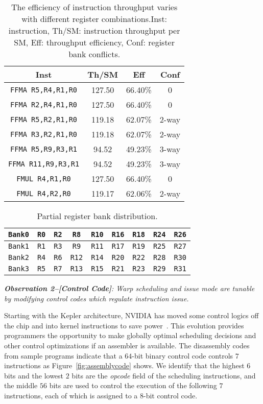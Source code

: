 \begin{table}[htbp]
    \caption{\small The efficiency of instruction throughput varies with different register combinations.Inst: instruction, Th/SM: instruction throughput per SM, Eff: throughput efficiency,  Conf: register bank conflicts.}
\centering
\scalebox{0.8} {
\begin{tabular}{|c|c|c|c|}
\hline
Inst &Th/SM&Eff&Conf\\
\hline
{\tt FFMA R5,R4,R1,R0}&127.50&66.40\%&0\\
\hline
{\tt FFMA R2,R4,R1,R0}&127.50&66.40\%&0\\
\hline
{\tt FFMA R5,R2,R1,R0}&119.18&62.07\%&2-way\\
\hline
{\tt FFMA R3,R2,R1,R0}&119.18&62.07\%&2-way\\
\hline
{\tt FFMA R5,R9,R3,R1}&94.52&49.23\%&3-way\\
\hline
{\tt FFMA R11,R9,R3,R1}&94.52&49.23\%&3-way\\
\hline
{\tt FMUL R4,R1,R0}&127.50&66.40\%&0\\
\hline
{\tt FMUL R4,R2,R0}&119.17&62.06\%&2-way\\
\hline
\end{tabular}
}
\label{tab:th}
\end{table}


\begin{table}[htbp]
\caption{\small Partial register bank distribution.}
\centering
\scalebox{0.8} {
\begin{tabular}{|c|c|c|c|c|c|c|c|c|}
\hline
    {\tt Bank0}&{\tt R0}&{\tt R2}&{\tt R8}&{\tt R10}&{\tt R16}&{\tt R18}&{\tt R24}&{\tt R26}\\
\hline
    {\tt Bank1}&{\tt R1}&{\tt R3}&{\tt R9}&{\tt R11}&{\tt R17}&{\tt R19}&{\tt R25}&{\tt R27} \\
\hline
    {\tt Bank2}&{\tt R4}&{\tt R6}&{\tt R12}&{\tt R14}&{\tt R20}&{\tt R22}&{\tt R28}&{\tt R30}\\
\hline
    {\tt Bank3}&{\tt R5}&{\tt R7}&{\tt R13}&{\tt R15}&{\tt R21}&{\tt R23}&{\tt R29}&{\tt R31}\\
\hline
\end{tabular}
}
\label{tab:reg}
\end{table}


{\em {\bf Observation 2--[Control Code]}:
Warp scheduling and issue mode are tunable by modifying control codes which regulate instruction issue.}

Starting with the Kepler architecture, NVIDIA has moved some control logics off the chip and into kernel
instructions to save power~\cite{lai,maxas}. 
This evolution provides programmers the opportunity to
make globally optimal scheduling decisions and other control optimizations if an assembler is available. 
The disassembly codes from sample programs indicate that a $64$-bit binary control code controls $7$ instructions as Figure~\ref{fig:assemblycode} shows.
We identify that the highest $6$ bits and the lowest $2$ bits are the {\em opcode} field of the scheduling instructions, and the middle $56$ bits are used to control the execution of the following $7$ instructions, each of which is assigned to a $8$-bit control code.


